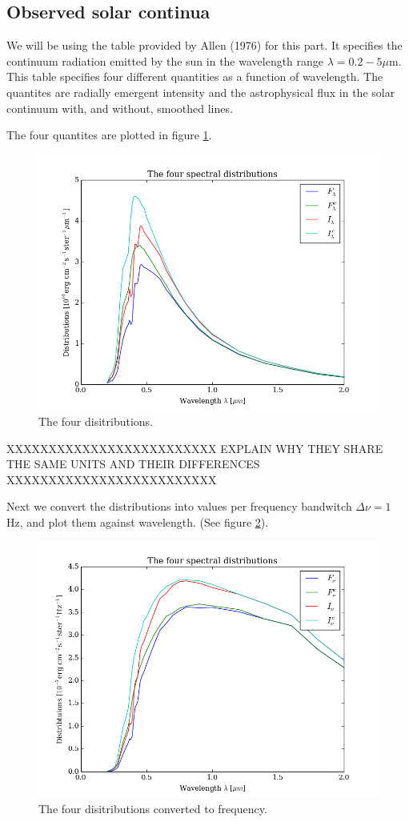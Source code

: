 \documentclass{aa}   %
\begin{document}
\subsection{Observed solar continua}
We will be using the table provided by Allen (1976) for this part. It specifies the continuum radiation emitted by the sun in the wavelength range $\lambda = 0.2 - 5\mu$m. This table specifies four different quantities as a function of wavelength. The quantites are radially emergent intensity and the astrophysical flux in the solar continuum with, and without, smoothed lines.

The four quantites are plotted in figure \ref{distrib}.
\begin{figure}
 \includegraphics[width=.49\textwidth]{distrib.png}
 \caption{The four disitributions.}
 \label{distrib} 
\end{figure}
XXXXXXXXXXXXXXXXXXXXXXXXX EXPLAIN WHY THEY SHARE THE SAME UNITS AND THEIR DIFFERENCES   XXXXXXXXXXXXXXXXXXXXXXXXX

Next we convert the distributions into values per frequency bandwitch $\Delta \nu = 1$ Hz, and plot them against wavelength. (See figure \ref{distrib_freq}).
\begin{figure}
 \includegraphics[width=.49\textwidth]{distrib_freq.png}
 \caption{The four disitributions converted to frequency.}
 \label{distrib_freq} 
\end{figure}
\end{document}
